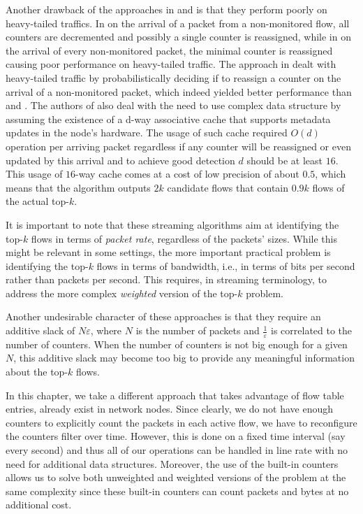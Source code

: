 Another drawback of the approaches in \cite{Demaine2002} and \cite{Metwally2005} is that they perform poorly on heavy-tailed traffics. In \cite{Demaine2002} on the arrival of a packet from a non-monitored flow, all counters are decremented and possibly a single counter is reassigned, while in \cite{Metwally2005} on the arrival of every non-monitored packet, the minimal counter is reassigned causing poor performance on heavy-tailed traffic. The approach in \cite{Ben-Basat2017} dealt with heavy-tailed traffic by probabilistically deciding if to reassign a counter on the arrival of a non-monitored packet, which indeed yielded better performance than \cite{Demaine2002} and \cite{Metwally2005}. The authors of \cite{Ben-Basat2017} also deal with the need to use complex data structure by assuming the existence of a d-way associative cache that supports metadata updates in the node’s hardware. The usage of such cache required $O(d)$ operation per arriving packet regardless if any counter will be reassigned or even updated by this arrival and to achieve good detection $d$ should be at least $16$. This usage of $16$-way cache comes at a cost of low precision of about $0.5$, which means that the algorithm outputs $2k$ candidate flows that contain $0.9k$ flows of the actual top-$k$.

It is important to note that these streaming algorithms aim at identifying the top-$k$ flows in terms of {\em packet rate}, regardless of the packets' sizes. While this might be relevant in some settings, the more important practical problem is identifying the top-$k$ flows in terms of bandwidth, i.e., in terms of bits per second rather than packets per second. This requires, in streaming terminology, to address the more complex {\em weighted} version of the top-$k$ problem.%

Another undesirable character of these approaches is that they require an additive slack of $N\varepsilon$, where $N$ is the number of packets and $\frac{1}{\varepsilon}$ is correlated to the number of counters. When the number of counters is not big enough for a given $N$, this additive slack may become too big to provide any meaningful information about the top-$k$ flows.

In this chapter, we take a different approach that takes advantage of flow table entries, already exist in network nodes. Since clearly, we do not have enough counters to explicitly count the packets in each active flow, we have to reconfigure the counters filter over time. However, this is done on a fixed time interval (say every second) and thus all of our operations can be handled in line rate with no need for additional data structures. Moreover, the use of the built-in counters allows us to solve both unweighted and weighted versions of the problem at the same complexity since these built-in counters can count packets and bytes at no additional cost.

